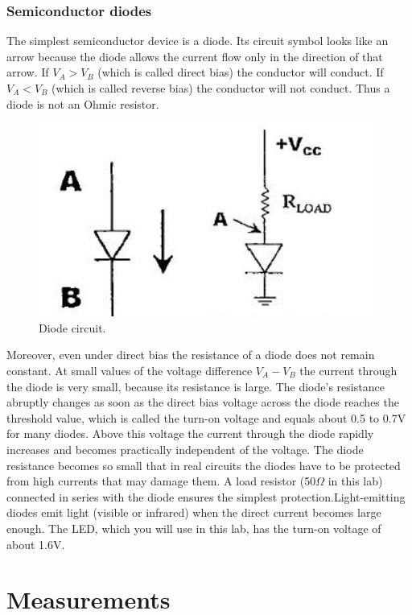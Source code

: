 \documentclass{article}
\begin{document}
\subsubsection{Semiconductor diodes}
The simplest semiconductor device is a diode. Its circuit symbol looks like an arrow because the diode allows the current flow only in the direction of that arrow. If $V_A>V_B$ (which is called direct bias) the conductor will conduct. If $V_A<V_B$ (which is called reverse bias) the conductor will not conduct. Thus a diode is not an Ohmic resistor. 
\\
\begin{figure}[H]\centering
\includegraphics[scale=0.4]{diode.png}
\caption{Diode circuit.}
\end{figure}

Moreover, even under direct bias the resistance of a diode does not remain constant. At small values of the voltage difference $V_A-V_B$ the current through the diode is very small, because its resistance is large. The diode’s resistance abruptly changes as soon as the direct bias voltage across the diode reaches the threshold value, which is called the turn-on voltage and equals about 0.5 to 0.7V for many diodes. Above this voltage the current through the diode rapidly increases and becomes practically independent of the voltage. The diode resistance becomes so small that in real circuits the diodes have to be protected from high currents that may damage them. A load resistor (50$ \Omega $ in this lab) connected in series with the diode ensures the simplest protection.Light-emitting diodes emit light (visible or infrared) when the direct current becomes large enough. The LED, which you will use in this lab, has the turn-on voltage of about 1.6V.

		\section{Measurements}
\end{document}
